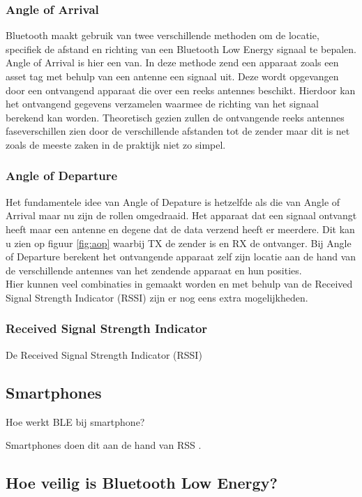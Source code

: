 \subsubsection{Angle of Arrival}

Bluetooth maakt gebruik van twee verschillende methoden om de locatie, specifiek de afstand en richting van een Bluetooth Low Energy signaal te bepalen. Angle of Arrival is hier een van. 
In deze methode zend een apparaat zoals een asset tag met behulp van een antenne een signaal uit. Deze wordt opgevangen door een ontvangend apparaat die over een reeks antennes beschikt. Hierdoor kan het ontvangend gegevens verzamelen waarmee de richting van het signaal berekend kan worden. Theoretisch gezien zullen de ontvangende reeks antennes faseverschillen zien door de verschillende afstanden tot de zender maar dit is net zoals de meeste zaken in de praktijk niet zo simpel.
\subsubsection{Angle of Departure}

Het fundamentele idee van Angle of Depature is hetzelfde als die van Angle of Arrival maar nu zijn de rollen omgedraaid. Het apparaat dat een signaal ontvangt heeft maar een antenne en degene dat de data verzend heeft er meerdere. Dit kan u zien op figuur \ref{fig:aop} waarbij TX de zender is en RX de ontvanger. Bij Angle of Departure berekent het ontvangende apparaat zelf zijn locatie aan de hand van de verschillende antennes van het zendende apparaat en hun posities.\\

Hier kunnen veel combinaties in gemaakt worden en met behulp van de Received Signal Strength Indicator (RSSI) zijn er nog eens extra mogelijkheden.


\subsubsection{Received Signal Strength Indicator}

De Received Signal Strength Indicator (RSSI)

\subsection{Smartphones}

Hoe werkt BLE bij smartphone?

Smartphones doen dit aan de hand van RSS \autocite{Chen2017}.


\subsection{Hoe veilig is Bluetooth Low Energy?}
